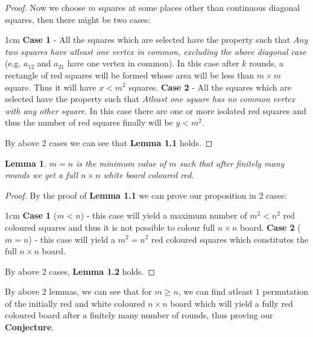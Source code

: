 \documentclass{article}
\newtheorem{lemma}{Lemma}[conjecture]
\newenvironment{myenv}{\begin{adjustwidth}{1cm}{}}{\end{adjustwidth}}
\begin{document}
{\begin{proof}
    Now we choose $m$ squares at some places other than continuous diagonal squares, then there might be two cases:
    \begin{myenv}
      \textbf{Case 1} - All the squares which are selected have the property such that \textit{Any two squares have atleast one vertex in common, excluding the above diagonal case} (e.g. $a_{12}$ and $a_{21}$ have one vertex in common). In this case after $k$ rounds, a rectangle of red squares will be formed whose area will be less than $m\times m$ square. Thus it will have $x<m^2$ squares. \newline
      \textbf{Case 2} - All the squares which are selected have the property such that \textit{Atleast one square has no common vertex with any other square}. In this case there are one or more isolated red squares and thus the number of red squares finally will be $y<m^2$.
    \end{myenv}
    By above 2 cases we can see that \textbf{Lemma 1.1} holds.
  \end{proof}
  \begin{lemma}
    $m=n$ is the minimum value of $m$ such that after finitely many rounds we get a full $n\times n$ white board coloured red.
  \end{lemma}
  \begin{proof}
    By the proof of \textbf{Lemma 1.1} we can prove our proposition in 2 cases:
    \begin{myenv}
      \textbf{Case 1} ($m<n$) - this case will yield a maximum number of $m^2<n^2$ red coloured squares and thus it is not possible to colour full $n\times n$ board. \newline
      \textbf{Case 2} ($m=n$) - this case will yield a $m^2=n^2$ red coloured squares which constitutes the full $n\times n$ board. \newline
    \end{myenv}
    By above 2 cases, \textbf{Lemma 1.2} holds.
  \end{proof}
  By above 2 lemmas, we can see that for $m\geqslant n$, we can find atleast $1$ permutation of the initially red and white coloured $n\times n$ board which will yield a fully red coloured board after a finitely many number of rounds, thus proving our \textbf{Conjecture}.
}
\end{document}
